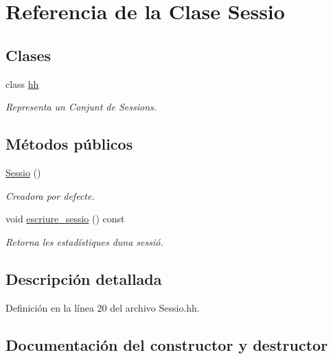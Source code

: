 \hypertarget{class_sessio}{}\section{Referencia de la Clase Sessio}
\label{class_sessio}
\subsection*{Clases}
\begin{DoxyCompactItemize}
\item 
class \mbox{\hyperlink{class_sessio_1_1hh}{hh}}
\begin{DoxyCompactList}\small\item\em Representa un Conjunt de Sessions. \end{DoxyCompactList}\end{DoxyCompactItemize}
\subsection*{Métodos públicos}
\begin{DoxyCompactItemize}
\item 
\mbox{\hyperlink{class_sessio_a2aeda3ca0902761f07d837538244539b}{Sessio}} ()
\begin{DoxyCompactList}\small\item\em Creadora por defecte. \end{DoxyCompactList}\item 
void \mbox{\hyperlink{class_sessio_a4a9fcbfd3973be306c7076af557a431c}{escriure\+\_\+sessio}} () const
\begin{DoxyCompactList}\small\item\em Retorna les estadístiques d\textquotesingle{}una sessió. \end{DoxyCompactList}\end{DoxyCompactItemize}


\subsection{Descripción detallada}


Definición en la línea 20 del archivo Sessio.\+hh.



\subsection{Documentación del constructor y destructor}
\mbox{\label{class_sessio_a2aeda3ca0902761f07d837538244539b}} 
